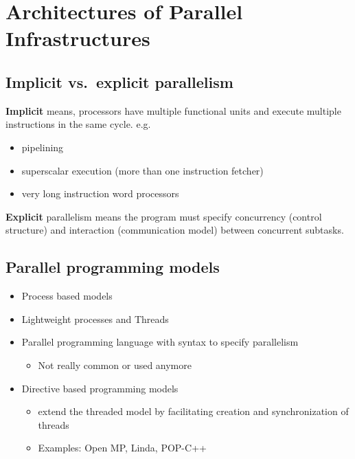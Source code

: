 \hypertarget{architectures-of-parallel-infrastructures}{%
\section{Architectures of Parallel
Infrastructures}\label{architectures-of-parallel-infrastructures}}

\hypertarget{implicit-vs.explicit-parallelism}{%
\subsection{Implicit vs.~explicit
parallelism}\label{implicit-vs.explicit-parallelism}}

\textbf{Implicit} means, processors have multiple functional units and
execute multiple instructions in the same cycle. e.g.

\begin{itemize}
\tightlist
\item
  pipelining
\item
  superscalar execution (more than one instruction fetcher)
\item
  very long instruction word processors
\end{itemize}

\textbf{Explicit} parallelism means the program must specify concurrency
(control structure) and interaction (communication model) between
concurrent subtasks.

\hypertarget{parallel-programming-models}{%
\subsection{Parallel programming
models}\label{parallel-programming-models}}

\begin{itemize}
\tightlist
\item
  Process based models
\item
  Lightweight processes and Threads
\item
  Parallel programming language with syntax to specify parallelism

  \begin{itemize}
  \tightlist
  \item
    Not really common or used anymore
  \end{itemize}
\item
  Directive based programming models

  \begin{itemize}
  \tightlist
  \item
    extend the threaded model by facilitating creation and
    synchronization of threads
  \item
    Examples: Open MP, Linda, POP-C++
  \end{itemize}
\end{itemize}


